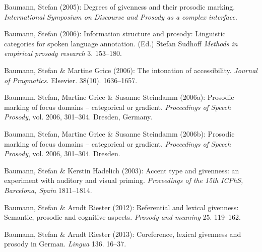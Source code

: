 \begin{styleBibliography}
Baumann, Stefan (2005): Degrees of givenness and their prosodic marking. \textit{International Symposium on Discourse and Prosody as a complex interface}.
\end{styleBibliography}

\begin{styleBibliography}
Baumann, Stefan (2006): Information structure and prosody: Linguistic categories for spoken language annotation. (Ed.) Stefan Sudhoff \textit{Methods in empirical prosody research} 3. 153–180.
\end{styleBibliography}

\begin{styleBibliography}
Baumann, Stefan \& Martine Grice (2006): The intonation of accessibility. \textit{Journal of Pragmatics}. Elsevier. 38(10). 1636–1657.
\end{styleBibliography}

\begin{styleBibliography}
Baumann, Stefan, Martine Grice \& Susanne Steindamm (2006a): Prosodic marking of focus domains – categorical or gradient. \textit{Proceedings of Speech Prosody}, vol. 2006, 301–304. Dresden, Germany.
\end{styleBibliography}

\begin{styleBibliography}
Baumann, Stefan, Martine Grice \& Susanne Steindamm (2006b): Prosodic marking of focus domains – categorical or gradient. \textit{Proceedings of Speech Prosody}, vol. 2006, 301–304. Dresden.
\end{styleBibliography}

\begin{styleBibliography}
Baumann, Stefan \& Kerstin Hadelich (2003): Accent type and givenness: an experiment with auditory and visual priming. \textit{Proceedings of the 15th ICPhS, Barcelona, Spain} 1811–1814.
\end{styleBibliography}

\begin{styleBibliography}
Baumann, Stefan \& Arndt Riester (2012): Referential and lexical givenness: Semantic, prosodic and cognitive aspects. \textit{Prosody and meaning} 25. 119–162.
\end{styleBibliography}

\begin{styleBibliography}
Baumann, Stefan \& Arndt Riester (2013): Coreference, lexical givenness and prosody in German. \textit{Lingua} 136. 16–37.
\end{styleBibliography}

